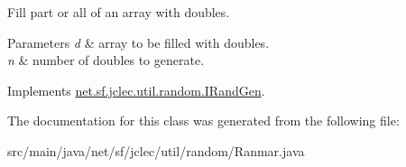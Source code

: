 Fill part or all of an array with doubles.


\begin{DoxyParams}{Parameters}
{\em d} & array to be filled with doubles. \\
\hline
{\em n} & number of doubles to generate.\\
\hline
\end{DoxyParams}
 

Implements \hyperlink{interfacenet_1_1sf_1_1jclec_1_1util_1_1random_1_1_i_rand_gen_ac30d440c578db88288430b1b8c36cace}{net.\-sf.\-jclec.\-util.\-random.\-I\-Rand\-Gen}.



The documentation for this class was generated from the following file\-:\begin{DoxyCompactItemize}
\item 
src/main/java/net/sf/jclec/util/random/Ranmar.\-java\end{DoxyCompactItemize}
